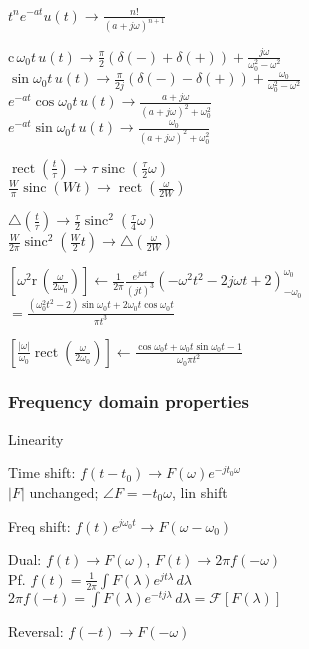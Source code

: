 \documentclass[4pt]{article}
\theoremstyle{definition}
\theoremstyle{definition}
\renewcommand{\c}{\mathrm{c}\,}
\renewcommand{\r}{\mathrm{r}\,}             %
\renewcommand{\o}{\omega}
\newcommand{\ra}{\rightarrow}
\DeclareMathOperator{\rect}{rect}
\DeclareMathOperator{\sinc}{sinc}
\begin{document}
\begin{multicols}{3}
    \(t^n e^{-at} u(t)\ra \frac{n!}{(a+j\o)^{n+1}}\)

    \(\c \o_0 t\, u(t)\ra \frac{\pi}{2}(\delta(-) + \delta(+)) + \frac{j\o}{\o_0^2-\o^2}\)\\       %
    \(\sin \o_0 t\, u(t)\ra \frac{\pi}{2j}(\delta(-) - \delta(+)) + \frac{\o_0}{\o_0^2-\o^2}\)\\
    \(e^{-at}\cos \o_0t\, u(t)\ra \frac{a+j\o}{(a+j\o)^2 + \o_0^2}\)\\
    \(e^{-at}\sin \o_0t\, u(t)\ra \frac{\o_0}{(a+j\o)^2 + \o_0^2}\)           


    $\rect(\frac t {\tau}) \ra \tau \sinc(\frac{\tau}{2}\omega)$\\ 
    $\frac W \pi \sinc(Wt) \ra \rect(\frac{\omega}{2W})$

    \(\triangle (\frac t {\tau}) \ra \frac{\tau}{2} \sinc^2 (\frac{\tau}{4}\omega)\)\\
    \(\frac{W}{2\pi} \sinc^2 (\frac{W}{2}t) \ra \triangle(\frac{\omega}{2W})\)

    \([\o^2 \r(\frac{\o}{2\o_0})] \leftarrow \frac{1}{2\pi} \frac{e^{j\o t}}{(jt)^3}(-\o^2t^2-2j\o t + 2)^{\o_0}_{-\o_0}\)\\
    \(=\frac{(\o_0^2 t^2 - 2)\sin \o_0 t + 2\o_0 t\cos \o_0 t}{\pi t^3}\)\

    \([\frac{|\o|}{\o_0} \rect(\frac{\o}{2\o_0})] \leftarrow \frac{\cos \o_0 t + \o_0 t \sin \o_0 t - 1}{\o_0 \pi t^2}\)
\subsubsection{Frequency domain properties}
    Linearity

    Time shift: \(f(t-t_0) \ra F(\omega) e^{-jt_0\omega}\) \\ %
    $|F|$ unchanged; $\angle F =- t_0\omega$, lin shift

    Freq shift: \(f(t) e^{j\omega_0 t} \ra F(\omega - \omega_0)\)  %

    Dual: \(f(t) \ra F(\omega)\), \(F(t) \ra 2\pi f(-\omega)\)\\ 
    Pf. \(f(t) = \frac 1 {2\pi} \int F(\lambda) e^{jt\lambda}\, d\lambda\)\\
    \(2\pi f(-t) = \int F(\lambda) e^{-tj\lambda}\, d\lambda = \mathcal{F}[F(\lambda)]\)

    Reversal: \(f(-t)\ra F(-\o)\)


\end{multicols}
\end{document}
